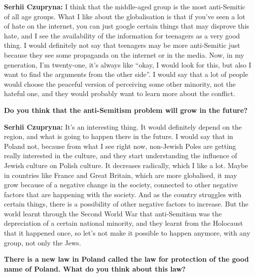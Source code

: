 \textbf{Serhii Czupryna:} I think that the middle-aged group is the most anti-Semitic of all age groups. What I like about the globalisation is that if you’ve seen a lot of hate on the internet, you can just google certain things that may disprove this hate, and I see the availability of the information for teenagers as a very good thing. I would definitely not say that teenagers may be more anti-Semitic just because they see some propaganda on the internet or in the media. Now, in my generation, I’m twenty-one, it’s always like ``okay, I would look for this, but also I want to find the arguments from the other side''. I would say that a lot of people would choose the peaceful version of perceiving some other minority, not the hateful one, and they would probably want to learn more about the conflict.\par
\textbf{Do you think that the anti-Semitism problem will grow in the future?}\par
\textbf{Serhii Czupryna:} It’s an interesting thing. It would definitely depend on the region, and what is going to happen there in the future. I would say that in Poland not, because from what I see right now, non-Jewish Poles are getting really interested in the culture, and they start understanding the influence of Jewish culture on Polish culture. It decreases radically, which I like a lot. Maybe in countries like France and Great Britain, which are more globalised, it may grow because of a negative change in the society, connected to other negative factors that are happening with the society. And as the country struggles with certain things, there is a possibility of other negative factors to increase. But the world learnt through the Second World War that anti-Semitism was the depreciation of a certain national minority, and they learnt from the Holocaust that it happened once, so let’s not make it possible to happen anymore, with any group, not only the Jews.\par
\textbf{There is a new law in Poland called the law for protection of the good name of Poland. What do you think about this law?} \par

